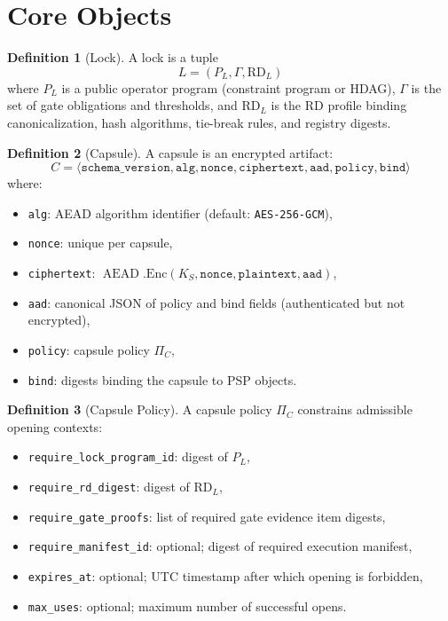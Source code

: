 \documentclass[11pt,a4paper,twoside]{article}
\theoremstyle{definition}
\newtheorem{definition}{Definition}[section]
\theoremstyle{plain}
\theoremstyle{remark}
\DeclareMathOperator{\AEAD}{AEAD}
\begin{document}
\section{Core Objects}\label{sec:cap:objects}

\begin{definition}[Lock]\label{def:lock}
A lock is a tuple
\[
  L = (P_L, \Gamma, \mathrm{RD}_L)
\]
where $P_L$ is a public operator program (constraint program or HDAG),
$\Gamma$ is the set of gate obligations and thresholds, and
$\mathrm{RD}_L$ is the RD profile binding canonicalization, hash
algorithms, tie-break rules, and registry digests.
\end{definition}

\begin{definition}[Capsule]\label{def:capsule}
A capsule is an encrypted artifact:
\[
  C = \langle \mathtt{schema\_version}, \mathtt{alg}, \mathtt{nonce},
      \mathtt{ciphertext}, \mathtt{aad}, \mathtt{policy},
      \mathtt{bind} \rangle
\]
where:
\begin{itemize}[nosep]
  \item \texttt{alg}: AEAD algorithm identifier (default:
        \texttt{AES-256-GCM}),
  \item \texttt{nonce}: unique per capsule,
  \item \texttt{ciphertext}: $\AEAD.\mathrm{Enc}(K_S, \mathtt{nonce},
        \mathtt{plaintext}, \mathtt{aad})$,
  \item \texttt{aad}: canonical JSON of policy and bind fields
        (authenticated but not encrypted),
  \item \texttt{policy}: capsule policy $\Pi_C$,
  \item \texttt{bind}: digests binding the capsule to PSP objects.
\end{itemize}
\end{definition}

\begin{definition}[Capsule Policy]\label{def:policy}
A capsule policy $\Pi_C$ constrains admissible opening contexts:
\begin{itemize}[nosep]
  \item \texttt{require\_lock\_program\_id}: digest of $P_L$,
  \item \texttt{require\_rd\_digest}: digest of $\mathrm{RD}_L$,
  \item \texttt{require\_gate\_proofs}: list of required gate evidence
        item digests,
  \item \texttt{require\_manifest\_id}: optional; digest of required
        execution manifest,
  \item \texttt{expires\_at}: optional; UTC timestamp after which opening
        is forbidden,
  \item \texttt{max\_uses}: optional; maximum number of successful opens.
\end{itemize}
\end{definition}
\end{document}
